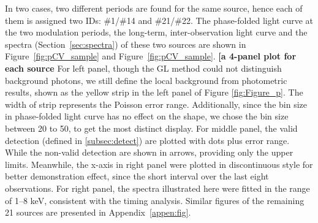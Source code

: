 \documentclass[twoside,twocolumn]{aastex63}
\begin{document}
In two cases, two different periods are found for the same source, hence each of them is assigned two IDs: \#1/\#14 and \#21/\#22.  
The phase-folded light curve at the two modulation periods, the long-term, inter-observation light curve and the spectra (Section~\ref{sec:spectra}) of these two sources are shown in Figure~\ref{fig:pCV_sample} and Figure~\ref{fig:pCV_sample}. {\bf [a 4-panel plot for each source}
For left panel, though the GL method could not distinguish background photons, we still define the local background from photometric results, shown as the yellow strip in the left panel of Figure \ref{fig:Figure_p}. The width of strip represents the Poisson error range.
Additionally, since the bin size in phase-folded light curve has no effect on the shape, we chose the bin size between 20 to 50, to get the most distinct display. 
For middle panel, the valid detection (defined in \ref{subsec:detect}) are plotted with dots plus error range. While the non-valid detection are shown in arrows, providing only the upper limits. Meanwhile, the x-axis in right panel were plotted in discontinuous style for better demonstration effect, since the short interval over the last eight observations. 
For right panel, the spectra illustrated here were fitted in the range of 1--8 keV, consistent with the timing analysis. 
Similar figures of the remaining 21 sources are presented in Appendix~\ref{appen:fig}.
\end{document}
